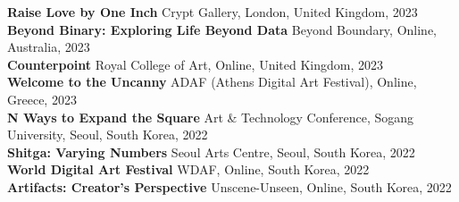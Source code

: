 \documentclass[a4paper,9pt]{extarticle}
\begin{document}
\textbf{Raise Love by One Inch} \hfill Crypt Gallery, London, United Kingdom, 2023\\
\textbf{Beyond Binary: Exploring Life Beyond Data} \hfill Beyond Boundary, Online, Australia, 2023\\
\textbf{Counterpoint} \hfill Royal College of Art, Online, United Kingdom, 2023\\
\textbf{Welcome to the Uncanny} \hfill ADAF (Athens Digital Art Festival), Online, Greece, 2023\\
\textbf{N Ways to Expand the Square} \hfill Art \& Technology Conference, Sogang University, Seoul, South Korea, 2022\\
\textbf{Shitga: Varying Numbers} \hfill Seoul Arts Centre, Seoul, South Korea, 2022\\
\textbf{World Digital Art Festival} \hfill WDAF, Online, South Korea, 2022\\
\textbf{Artifacts: Creator's Perspective} \hfill Unscene-Unseen, Online, South Korea, 2022\\






\end{document}
